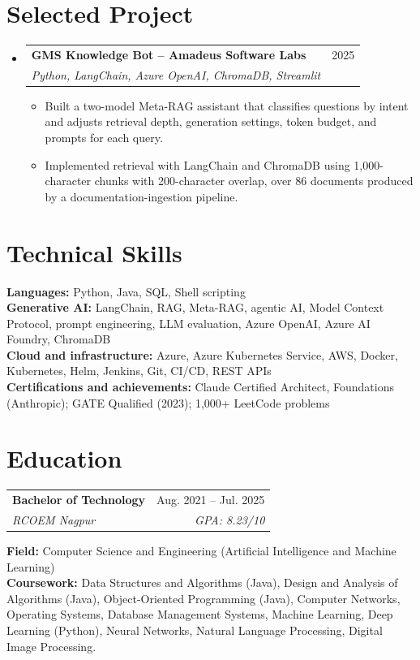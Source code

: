 \documentclass[a4paper,11pt]{article}
\makeatletter
\newcommand{\entry}[4]{\item\begin{tabularx}{\textwidth}{@{}Xr@{}}\textbf{#1}& #2\\\textit{\small #3}&\textit{\small #4}\end{tabularx}\vspace{-5pt}}
\newcommand{\bulletpoint}[1]{\item\small{#1}}
\makeatother
\begin{document}
\section{Selected Project}
\begin{itemize}[leftmargin=0in,label={}]
  \entry{GMS Knowledge Bot -- Amadeus Software Labs}{2025}{Python, LangChain, Azure OpenAI, ChromaDB, Streamlit}{}
  \begin{itemize}
    \bulletpoint{Built a two-model Meta-RAG assistant that classif{}ies questions by intent and adjusts retrieval depth, generation settings, token budget, and prompts for each query.}
    \bulletpoint{Implemented retrieval with LangChain and ChromaDB using 1,000-character chunks with 200-character overlap, over 86 documents produced by a documentation-ingestion pipeline.}
  \end{itemize}
\end{itemize}

\section{Technical Skills}
\small\textbf{Languages:} Python, Java, SQL, Shell scripting \\
\textbf{Generative AI:} LangChain, RAG, Meta-RAG, agentic AI, Model Context Protocol, prompt engineering, LLM evaluation, Azure OpenAI, Azure AI Foundry, ChromaDB \\
\textbf{Cloud and infrastructure:} Azure, Azure Kubernetes Service, AWS, Docker, Kubernetes, Helm, Jenkins, Git, CI/CD, REST APIs \\
\textbf{Certif{}ications and achievements:} Claude Certif{}ied Architect, Foundations (Anthropic); GATE Qualif{}ied (2023); 1,000+ LeetCode problems

\section{Education}
\begin{tabularx}{\textwidth}{@{}Xr@{}}
  \textbf{Bachelor of Technology} & Aug. 2021 -- Jul. 2025 \\
  \textit{\small RCOEM Nagpur} & \textit{\small GPA: 8.23/10} \\
\end{tabularx}
\small\textbf{Field:} Computer Science and Engineering (Artif{}icial Intelligence and Machine Learning)\\
\small\textbf{Coursework:} Data Structures and Algorithms (Java), Design and Analysis of Algorithms (Java), Object-Oriented Programming (Java), Computer Networks, Operating Systems, Database Management Systems, Machine Learning, Deep Learning (Python), Neural Networks, Natural Language Processing, Digital Image Processing.
\end{document}
